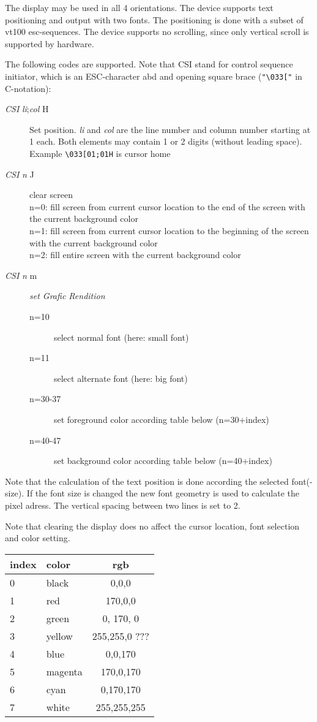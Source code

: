 The display may be used in all 4 orientations. The device supports
text positioning and output with two fonts. The positioning is done with
a subset of vt100 esc-sequences.
The device supports no scrolling, since only vertical scroll is supported 
by hardware.

The following codes are supported. Note that CSI stand for
control sequence initiator, which is an ESC-character abd and opening square 
brace (\verb|"\033["| in C-notation):
\begin{description}
\item[{\em CSI}  {\em li};{\em col} H] 
    Set position. {\em li} and {\em col} are the line
    number and column number starting at 1 each. Both elements may contain
    1 or 2 digits (without leading space). Example \verb|\033[01;01H|
 is cursor home
\item[{\em CSI}  {\em n} J]  clear screen\\
n=0: fill screen from current cursor location to the end of the 
    screen with the current background color
\\
n=1: fill screen from current cursor location to the beginning of the 
    screen with the current background color
\\
n=2: fill entire screen with the current background color
\item[{\em CSI}  {\em n} m] {\em set Grafic Rendition}
    \begin{description}
    \item[n=10] select normal font (here: small font)
    \item[n=11] select alternate font (here: big font)
    \item[n=30-37] set foreground color according table below (n=30+index)
    \item[n=40-47] set background color according table below (n=40+index)
    \end{description}
\end{description}

Note that the calculation of the text position is done according the 
selected font(-size). If the font size is changed the new font geometry 
is used to calculate the pixel adress. The vertical spacing between two lines
is set to 2.

Note that clearing the display does no affect the cursor location, 
font selection and color setting.

\begin{tabular}{|l|l|c|}
\hline
index & color  & rgb \\
\hline
0 & black  & 0,0,0\\
1 & red  & 170,0,0\\
2 & green & 0, 170, 0 \\
3 & yellow & 255,255,0 ???\\
4 & blue & 0,0,170\\
5 & magenta & 170,0,170\\
6 & cyan & 0,170,170\\
7 &white & 255,255,255\\
\hline
\end{tabular}

